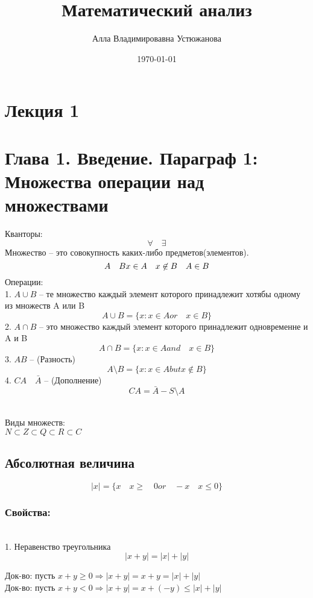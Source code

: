 \documentclass[a4paper, 12pt]{article}
\title{Математический анализ}
\author{Алла Владимировавна Устюжанова}
\date{\today}
\begin{document}
\maketitle
\section*{Лекция 1}

\section{Глава 1. Введение. Параграф 1: Множества операции над множествами}
Кванторы:
\[
	\forall \quad \exists
\]
Множество -- это совокупность каких-либо предметов(элементов).
\[
	A \quad B  \\
	x \in A\\ \quad
	x \not\in B	\\\quad
	A \in B\\
\]
Операции: \\
1. $ A \cup B $ -- те множество каждый элемент которого принадлежит хотябы одному из множеств A или B \[
	A \cup B = \{x:x \in A or \quad x \in B\}	
\]
2. $ A \cap B $ -- это множество каждый элемент которого принадлежит одновременне и A и B \[
	 A \cap B = \{x: x\in A and \quad x \in B\}	
\]
3. $ A B $ -- (Разность)\[
	A \setminus B = \{x: x\in A but x\not\in B\}	
\]
4. $ CA \quad\bar{A} $ -- (Дополнение) \[
	CA = \bar{A} - S\setminus A	
\]

\\
Виды множеств:\\
$ N \subset Z \subset Q \subset R \subset C $\\

\subsection{Абсолютная величина}
\[
	|x| = \{x \quad x \geq \quad0 or \quad -x \quad x\leq 0\}	
\]
\subsubsection*{Свойства:}\\
1. Неравенство треугольника \[
 |x+y| = |x| + |y|	
\]
\begin{mdframed}[backgroundcolor=blue!20] 
       Док-во: пусть $  x+y \geq 0\Rightarrow |x+y| = x+y=|x|+|y|$\\
       Док-во: пусть $  x+y < 0\Rightarrow |x+y| = x+(-y)\leq|x|+|y|$
    \end{mdframed}
\end{document}
